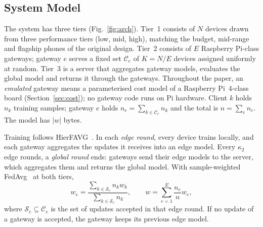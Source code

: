 \documentclass[conference]{IEEEtran}
\newcommand{\wsize}{|w|}
\begin{document}
\subsection{System Model}
The system has three tiers (Fig.~\ref{fig:arch}). Tier~1 consists of $N$ devices drawn from three performance tiers (low, mid, high), matching the budget, mid-range and flagship phones of the original design. Tier~2 consists of $E$ Raspberry Pi-class gateways; gateway $e$ serves a fixed set $\mathcal{C}_e$ of $K = N/E$ devices assigned uniformly at random. Tier~3 is a server that aggregates gateway models, evaluates the global model and returns it through the gateways. Throughout the paper, an \emph{emulated} gateway means a parameterised cost model of a Raspberry Pi~4-class board (Section~\ref{sec:cost}); no gateway code runs on Pi hardware. Client $k$ holds $n_k$ training samples; gateway $e$ holds $n_e = \sum_{k \in \mathcal{C}_e} n_k$ and the total is $n = \sum_e n_e$. The model has $\wsize$ bytes.

Training follows HierFAVG~\cite{liu2020}. In each \emph{edge round}, every device trains locally, and each gateway aggregates the updates it receives into an edge model. Every $\kappa_2$ edge rounds, a \emph{global round} ends: gateways send their edge models to the server, which aggregates them and returns the global model. With sample-weighted FedAvg~\cite{mcmahan2017} at both tiers,
\begin{equation}
w_e = \frac{\sum_{k \in \mathcal{S}_e} n_k w_k}{\sum_{k \in \mathcal{S}_e} n_k}, \qquad
w = \sum_{e=1}^{E} \frac{n_e}{n} w_e ,
\label{eq:agg}
\end{equation}
where $\mathcal{S}_e \subseteq \mathcal{C}_e$ is the set of updates accepted in that edge round. If no update of a gateway is accepted, the gateway keeps its previous edge model.
\end{document}
